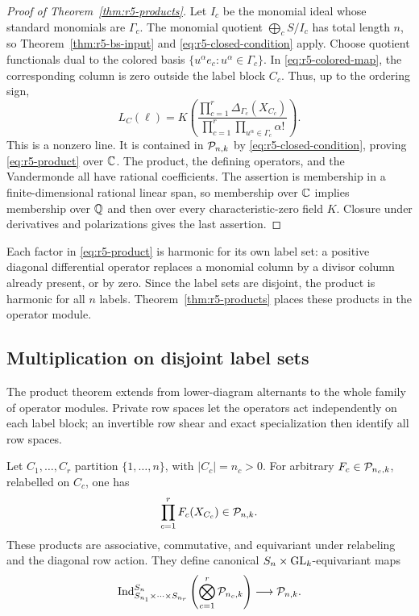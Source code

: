 \begin{proof}[Proof of Theorem~\ref{thm:r5-products}]
Let $I_c$ be the monomial ideal whose standard monomials are
$\Gamma_c$.  The monomial quotient $\bigoplus_c S/I_c$ has total
length $n$, so Theorem~\ref{thm:r5-bs-input} and
\eqref{eq:r5-closed-condition} apply.
Choose quotient functionals dual to the colored basis
$\{u^\alpha e_c:u^\alpha\in\Gamma_c\}$.
In \eqref{eq:r5-colored-map}, the corresponding column is zero
outside the label block $C_c$.  Thus, up to the ordering sign,
\[
 L_C(\ell)=
 K\left(
   \frac{\prod_{c=1}^r\Delta_{\Gamma_c}(X_{C_c})}
        {\prod_{c=1}^r\prod_{u^\alpha\in\Gamma_c}\alpha!}
     \right).
\]
This is a nonzero line.  It is contained in $\mathcal P_{n,k}$ by
\eqref{eq:r5-closed-condition}, proving \eqref{eq:r5-product} over
$\mathbb C$.  The product, the defining operators, and the Vandermonde all
have rational coefficients.  The assertion is membership in a
finite-dimensional rational linear span, so membership over $\mathbb C$
implies membership over $\mathbb Q$ and then over every characteristic-zero
field $K$.  Closure under derivatives and polarizations gives the
last assertion.
\end{proof}

Each factor in \eqref{eq:r5-product} is harmonic for its own label
set: a positive diagonal differential operator replaces a monomial
column by a divisor column already present, or by zero.  Since the
label sets are disjoint, the product is harmonic for all $n$ labels.
Theorem~\ref{thm:r5-products} places these products in the operator module.

\subsection{Multiplication on disjoint label sets}

The product theorem extends from lower-diagram alternants to the
whole family of operator modules.  Private row spaces let the
operators act independently on each label block; an invertible row
shear and exact specialization then identify all row spaces.

\begin{theorem}
\label{thm:r5-disjoint-products}
Let $C_1,\ldots,C_r$ partition $\{1,\ldots,n\}$, with
$|C_c|=n_c>0$.  For arbitrary
$F_c\in\mathcal P_{n_c,k}$, relabelled on $C_c$, one has
\[
                         \prod_{c=1}^r F_c(X_{C_c})\in\mathcal P_{n,k}.
\]
These products are associative, commutative, and equivariant under
relabeling and the diagonal row action.  They define canonical
$S_n\times\operatorname{GL}_k$-equivariant maps
\begin{equation}\label{eq:r5-induced-product}
 \operatorname{Ind}_{S_{n_1}\times\cdots\times S_{n_r}}^{S_n}
       \left(\bigotimes_{c=1}^r\mathcal P_{n_c,k}\right)
                         \longrightarrow\mathcal P_{n,k}.
\end{equation}
\end{theorem}

